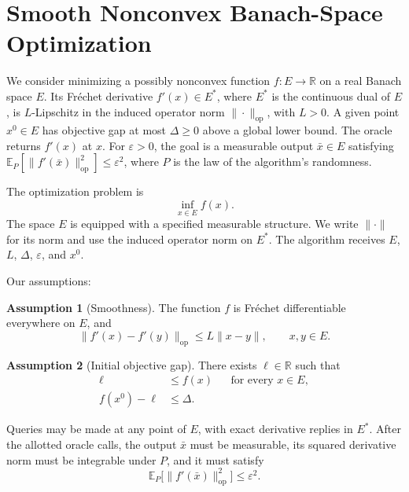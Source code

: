 \documentclass[10pt]{article}
\theoremstyle{definition}
\newtheorem{assumption}{Assumption}
\begin{document}
\section*{Smooth Nonconvex Banach-Space Optimization}
We consider minimizing a possibly nonconvex function $f:E\to\mathbb{R}$ on a real Banach space $E$. Its Fr\'echet derivative $f'(x)\in E^*$, where $E^*$ is the continuous dual of $E$, is $L$-Lipschitz in the induced operator norm $\|\cdot\|_{\mathrm{op}}$, with $L>0$. A given point $x^0\in E$ has objective gap at most $\Delta\geq0$ above a global lower bound. The oracle returns $f'(x)$ at $x$. For $\varepsilon>0$, the goal is a measurable output $\bar{x}\in E$ satisfying $\mathbb{E}_{P}[\|f'(\bar{x})\|_{\mathrm{op}}^2]\leq\varepsilon^2$, where $P$ is the law of the algorithm's randomness.

The optimization problem is
\[
\inf_{x\in E} f(x).
\]
The space $E$ is equipped with a specified measurable structure. We write $\|\cdot\|$ for its norm and use the induced operator norm on $E^*$. The algorithm receives $E$, $L$, $\Delta$, $\varepsilon$, and $x^0$.

Our assumptions:
\begin{assumption}[Smoothness]
The function $f$ is Fr\'echet differentiable everywhere on $E$, and
\[
\|f'(x)-f'(y)\|_{\mathrm{op}}
\leq L\|x-y\|,
\qquad x,y\in E.
\]
\end{assumption}

\begin{assumption}[Initial objective gap]
There exists $\ell\in\mathbb{R}$ such that
\[
\begin{aligned}
\ell&\leq f(x) &&\text{for every }x\in E,\\
f(x^0)-\ell&\leq\Delta.
\end{aligned}
\]
\end{assumption}

Queries may be made at any point of $E$, with exact derivative replies in $E^*$. After the allotted oracle calls, the output $\bar{x}$ must be measurable, its squared derivative norm must be integrable under $P$, and it must satisfy
\[
\mathbb{E}_{P}\bigl[\|f'(\bar{x})\|_{\mathrm{op}}^2\bigr]
\leq\varepsilon^2.
\]
\end{document}
